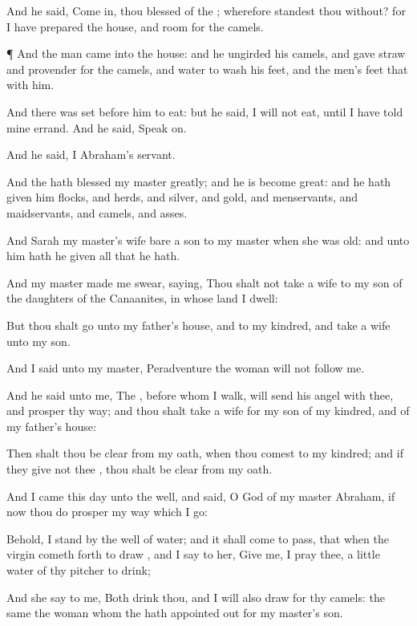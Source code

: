 {And he
said, Come
in, thou
blessed of the
{}; wherefore
standest thou
without? for I have
prepared the
house, and
room for the
camels.


\par }{\PP {}¶ And the
man
came into the
house: and he
ungirded his
camels, and
gave
straw and
provender for the
camels, and
water to
wash his
feet, and the
men’s
feet that
{} with him.

And there was
set
{} before
him to
eat: but he
said, I will not
eat, until I have
told mine
errand. And he
said, Speak
on.

And he
said, I
{}
Abraham’s
servant.

And the
{} hath
blessed my
master
greatly; and he is become
great: and he hath
given him
flocks, and
herds, and
silver, and
gold, and
menservants, and
maidservants, and
camels, and
asses.

And
Sarah my
master’s
wife
bare a
son to my
master
when she was
old: and unto him hath he
given all that he hath.

And my
master made me
swear,
saying, Thou shalt not
take a
wife to my
son of the
daughters of the
Canaanites, in whose
land I
dwell:

But thou shalt
go unto my
father’s
house, and to my
kindred, and
take a
wife unto my
son.

And I
said unto my
master, Peradventure the
woman will not
follow me.

And he
said unto me, The
{},
before whom I
walk, will
send his
angel with thee, and
prosper thy
way; and thou shalt
take a
wife for my
son of my
kindred, and of my
father’s
house:

Then shalt thou be
clear from
{} my
oath, when thou
comest to my
kindred; and if they
give not thee
{}, thou shalt be
clear from my
oath.

And I
came this
day unto the
well, and
said, O
{}
God of my
master
Abraham, if now thou
do
prosper my
way which I
go:

Behold, I
stand by the
well of
water; and it shall come to pass, that when the
virgin cometh
forth to
draw
{}, and I
say to her, Give
me, I pray thee, a
little
water of thy
pitcher to
drink;

And she
say to me, Both
drink thou, and I will also
draw for thy
camels:
{} the same
{} the
woman whom the
{} hath appointed
out for my
master’s
son.

}
